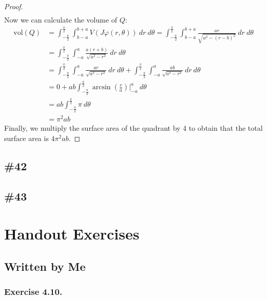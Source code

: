 \documentclass{article}
\newcommand{\vol}{\mathrm{vol}}
\theoremstyle{plain} %
\numberwithin{thm}{section} %
\theoremstyle{definition}
\begin{document}
\begin{proof}
\begin{align*}
        \end{align*}
        Now we can calculate the volume of \(Q\):
        \begin{align*}
            \vol (Q) &= \int _{-\frac{\pi}{2}}^{\frac{\pi}{2}} \int _{b-a}^{b+a} V(J \varphi (r, \theta))\ dr\ d \theta = \int _{-\frac{\pi}{2}}^{\frac{\pi}{2}} \int _{b-a}^{b+a} \frac{ar}{\sqrt{a^2 - (r-b)^2}}\ dr\ d \theta \\
            &= \int _{-\frac{\pi}{2}}^{\frac{\pi}{2}} \int _{-a}^a \frac{a(r + b)}{\sqrt{a^2 - r^2}}\ dr\ d\theta \tag{substitution \(r \mapsto r - b\)} \\
            &= \int _{-\frac{\pi}{2}}^{\frac{\pi}{2}} \int _{-a}^a \frac{ar}{\sqrt{a^2 - r^2}}\ dr\ d \theta + \int _{-\frac{\pi}{2}}^{\frac{\pi}{2}} \int _{-a}^a \frac{ab}{\sqrt{a^2 - r^2}}\ dr\ d \theta \\
            &= 0 + ab\int _{-\frac{\pi}{2}}^{\frac{\pi}{2}} \arcsin \left( \frac{r}{a}\right) \Big| _{-a}^{a}\ d \theta \tag{first integrand is odd} \\
            &= ab \int _{-\frac{\pi}{2}}^{\frac{\pi}{2}} \pi\ d \theta \\
            &= \pi ^2 ab
        \end{align*}
        Finally, we multiply the surface area of the quadrant by 4 to obtain that the total surface area is \(4\pi ^2 ab\).
        \end{proof}
        \newpage
        \subsection{\#42}
        \newpage
        \subsection{\#43}











    \section{Handout Exercises}
    \subsection{Written by Me}

    \subsubsection{Exercise 4.10.}
    
\end{document}
